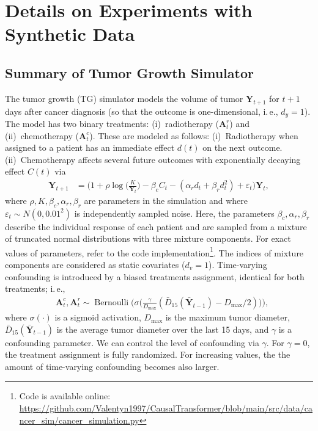 \documentclass{article}
\newcommand\ie{i.\,e.\xspace}
\theoremstyle{plain}
\theoremstyle{definition}
\theoremstyle{remark}
\begin{document}
\clearpage
\section{Details on Experiments with Synthetic Data} 
\label{app:syn}

\subsection{Summary of Tumor Growth Simulator} 

The tumor growth (TG) simulator \cite{geng2017prediction} models the volume of tumor $\mathbf{Y}_{t+1}$ for $t+1$ days after cancer diagnosis (so that the outcome is one-dimensional, \ie, $d_y = 1$). The model has two binary treatments: (i)~radiotherapy ($\mathbf{A}^r_t$) and (ii)~chemotherapy ($\mathbf{A}^c_t$). These are modeled as follows: (i)~Radiotherapy when assigned to a patient has an immediate effect $d(t)$ on the next outcome. (ii)~Chemotherapy affects several future outcomes with exponentially decaying effect $C(t)$ via
\begin{align}
    \mathbf{Y}_{t+1} &= \bigg(1 + \rho \log \Big(\frac{K}{\mathbf{Y}_{t}}\Big) - \beta_c C_t - (\alpha_r d_t + \beta_r d_t^2) + \varepsilon_t \bigg) \mathbf{Y}_{t} ,
\end{align}
where $\rho, K, \beta_c, \alpha_r, \beta_r$ are parameters in the simulation and where $\varepsilon_t \sim N(0, 0.01^2)$ is independently sampled noise. Here, the parameters $\beta_c, \alpha_r, \beta_r$ describe the individual response of each patient and are sampled from a mixture of truncated normal distributions with three mixture components. For exact values of parameters, refer to the code implementation\footnote{Code is available online: \url{https://github.com/Valentyn1997/CausalTransformer/blob/main/src/data/cancer_sim/cancer_simulation.py}}. The indices of mixture components are considered as static covariates ($d_v = 1$). Time-varying confounding is introduced by a biased treatments assignment, identical for both treatments; \ie,
\begin{align}
    & \mathbf{A}^c_t, \mathbf{A}^r_t \sim \operatorname{Bernoulli}\bigg( \sigma \Big( \frac{\gamma}{D_{\text{max}}}(\bar{D}_{15}(\bar{\mathbf{Y}}_{t-1}) - D_{\text{max}} / 2) \Big) \bigg) ,
\end{align}
where $\sigma(\cdot)$ is a sigmoid activation, $D_{\text{max}}$ is the maximum tumor diameter, $\bar{D}_{15}(\bar{\mathbf{Y}}_{t-1})$ is the average tumor diameter over the last 15 days, and $\gamma$ is a confounding parameter. We can control the level of confounding via $\gamma$. For $\gamma=0$, the treatment assignment is fully randomized. For increasing values, the the amount of time-varying confounding becomes also larger.
\end{document}

